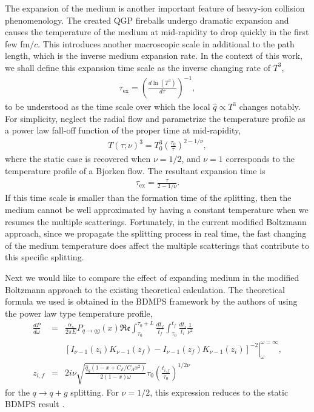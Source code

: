 \documentclass[aps, prc, reprint, amsmath, groupedaddress, nofootinbib]{revtex4-1}
\begin{document}
The expansion of the medium is another important feature of heavy-ion collision phenomenology.
The created QGP fireballs undergo dramatic expansion and causes the temperature of the medium at mid-rapidity to drop quickly in the first few fm$/c$.
This introduces another macroscopic scale in additional to the path length, which is the inverse medium expansion rate. 
In the context of this work, we shall define this expansion time scale as the inverse changing rate of $T^3$,
\begin{eqnarray}
\tau_{\textrm{ex}} = \left(\frac{d\ln(T^3)}{d \tau} \right)^{-1},
\end{eqnarray}
to be understood as the time scale over which the local $\hat{q}\propto T^3$ changes notably.
For simplicity, neglect the radial flow and parametrize the temperature profile as a power law fall-off function of the proper time at mid-rapidity,
\begin{eqnarray}
T(\tau; \nu)^3 = T_0^3\left(\frac{\tau_0}{\tau}\right)^{2-1/\nu},
\end{eqnarray}
where the static case is recovered when $\nu=1/2$, and $\nu=1$ corresponds to the temperature profile of a Bjorken flow.
The resultant expansion time is
\begin{eqnarray}
\tau_{\textrm{ex}} = \frac{\tau}{2-1/\nu}.
\end{eqnarray}
If this time scale is smaller than the formation time of the splitting, then the medium cannot be well approximated by having a constant temperature when we resumes the multiple scatterings.
Fortunately, in the current modified Boltzmann approach, since we propagate the splitting process in real time, the fast changing of the medium temperature does affect the multiple scatterings that contribute to this specific splitting.

Next we would like to compare the effect of expanding medium in the modified Boltzmann approach to the existing theoretical calculation.
The theoretical formula we used is obtained in the BDMPS framework 
by the authors of \cite{Baier:1998yf} using the power law type temperature profile,
\begin{eqnarray}
\frac{dP}{d\omega} &=& \frac{\alpha_s}{2\pi E}P_{q\rightarrow qg}(x)\mathfrak{Re}\int_{\tau_0}^{\tau_0+L}\frac{dt_f}{t_f}\int_{\tau_0}^{t_f}\frac{dt_i}{t_i} \frac{1}{\nu^2}\\
\nonumber
&& \left.\left[ I_{\nu-1}(z_i)K_{\nu-1}(z_f)-I_{\nu-1}(z_f)K_{\nu-1}(z_i)\right]^{-2}\right|_{\omega}^{\omega=\infty},\\
z_{i,f} &=& 2i\nu \sqrt{\frac{\hat{q}_g(1-x+C_F/C_A x^2)}{2(1-x)\omega}} \tau_0 \left( \frac{t_{i,f}}{\tau_0}\right) ^{1/2\nu}
\end{eqnarray}
for the $q\rightarrow q+g$ splitting.
For $\nu=1/2$, this expression reduces to the static BDMPS result \cite{Baier:1996kr}. 
\end{document}
